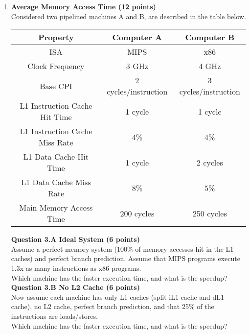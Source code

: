 \documentclass[a4paper,10pt]{article}
\begin{document}
\begin{enumerate}
\item \textbf{Average Memory Access Time (12 points)} \\
Considered two pipelined machines A and B, are described in the table below.
 \begin{center}
\begin{tabular}{ccc}
\toprule  
\textbf{Property} & \textbf{ Computer A} & \textbf{ Computer B}  \\
\midrule  
ISA & MIPS & x86\\
\midrule
Clock Frequency & 3 GHz & 4 GHz\\
\midrule
Base CPI & 2 cycles/instruction & 3 cycles/instruction\\
\midrule
L1 Instruction Cache Hit Time & 1 cycle & 1 cycle\\
\midrule
L1 Instruction Cache Miss Rate & 4\%  & 4\% \\
\midrule
L1 Data Cache Hit Time & 1 cycle & 2 cycles\\
\midrule
L1 Data Cache Miss Rate & 8\%  & 5\% \\
\midrule
Main Memory Access Time & 200 cycles  & 250 cycles \\
\bottomrule 
\end{tabular}
\end{center}

\textbf{Question 3.A Ideal System (6 points)}\\
Assume a perfect memory system (100\% of memory accesses hit in the L1 caches) and perfect branch prediction. Assume that MIPS programs execute 1.3x as many instructions as x86 programs. \\
Which machine has the faster execution time, and what is the speedup?\\


\textbf{Question 3.B  No L2 Cache (6 points)}\\
Now assume each machine has only L1 caches (split iL1 cache and dL1 cache), no L2 cache, perfect branch prediction, and that 25\% of the instructions are loads/stores. \\
Which machine has the faster execution time, and what is the speedup?\\


\end{enumerate}
\end{document}
